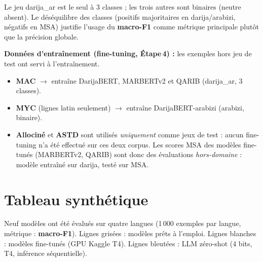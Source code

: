 \documentclass[11pt, a4paper]{article}
\begin{document}
\vspace{2pt}
Le jeu darija\_ar est le seul à 3 classes ; les trois autres sont binaires (neutre absent).
Le déséquilibre des classes (positifs majoritaires en darija/arabizi, négatifs en MSA) justifie
l'usage du \textbf{macro-F1} comme métrique principale plutôt que la précision globale.

\medskip
\textbf{Données d'entraînement (fine-tuning, Étape\,4) :} les exemples hors jeu de test ont servi à l'entraînement.
\begin{itemize}
  \item \textbf{MAC} $\rightarrow$ entraîne DarijaBERT, MARBERTv2 et QARIB (darija\_ar, 3 classes).
  \item \textbf{MYC} (lignes latin seulement) $\rightarrow$ entraîne DarijaBERT-arabizi (arabizi, binaire).
  \item \textbf{Allociné} et \textbf{ASTD} sont utilisés \emph{uniquement} comme jeux de test : aucun fine-tuning n'a été
        effectué sur ces deux corpus. Les scores MSA des modèles fine-tunés (MARBERTv2, QARIB) sont donc
        des évaluations \emph{hors-domaine} : modèle entraîné sur darija, testé sur MSA.
\end{itemize}

\section{Tableau synthétique}

Neuf modèles ont été évalués sur quatre langues (1\,000 exemples par langue,
métrique : \textbf{macro-F1}). Lignes grisées : modèles prêts à l'emploi.
Lignes blanches : modèles fine-tunés (GPU Kaggle T4).
Lignes bleutées : LLM zéro-shot (4 bits, T4, inférence séquentielle).
\end{document}
